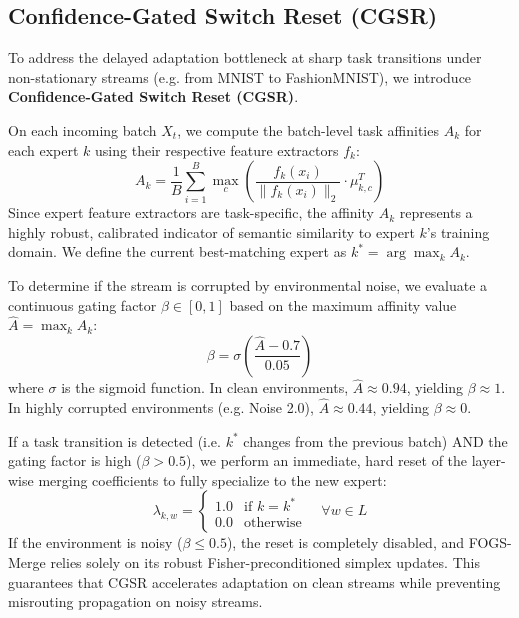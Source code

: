 \documentclass{article}
\theoremstyle{plain}
\theoremstyle{definition}
\theoremstyle{remark}
\begin{document}
\subsection{Confidence-Gated Switch Reset (CGSR)}
To address the delayed adaptation bottleneck at sharp task transitions under non-stationary streams (e.g. from MNIST to FashionMNIST), we introduce \textbf{Confidence-Gated Switch Reset (CGSR)}.

On each incoming batch $X_t$, we compute the batch-level task affinities $A_k$ for each expert $k$ using their respective feature extractors $f_k$:
\begin{equation}
A_k = \frac{1}{B} \sum_{i=1}^B \max_{c} \left( \frac{f_k(x_i)}{\|f_k(x_i)\|_2} \cdot \mu_{k, c}^T \right)
\end{equation}
Since expert feature extractors are task-specific, the affinity $A_k$ represents a highly robust, calibrated indicator of semantic similarity to expert $k$'s training domain. We define the current best-matching expert as $k^* = \arg\max_{k} A_k$.

To determine if the stream is corrupted by environmental noise, we evaluate a continuous gating factor $\beta \in [0, 1]$ based on the maximum affinity value $\hat{A} = \max_k A_k$:
\begin{equation}
\beta = \sigma\left( \frac{\hat{A} - 0.7}{0.05} \right)
\end{equation}
where $\sigma$ is the sigmoid function. In clean environments, $\hat{A} \approx 0.94$, yielding $\beta \approx 1$. In highly corrupted environments (e.g. Noise 2.0), $\hat{A} \approx 0.44$, yielding $\beta \approx 0$.

If a task transition is detected (i.e. $k^*$ changes from the previous batch) AND the gating factor is high ($\beta > 0.5$), we perform an immediate, hard reset of the layer-wise merging coefficients to fully specialize to the new expert:
\begin{equation}
\lambda_{k,w} = 
\begin{cases}
1.0 & \text{if } k = k^* \\
0.0 & \text{otherwise}
\end{cases} \quad \forall w \in L
\end{equation}
If the environment is noisy ($\beta \leq 0.5$), the reset is completely disabled, and FOGS-Merge relies solely on its robust Fisher-preconditioned simplex updates. This guarantees that CGSR accelerates adaptation on clean streams while preventing misrouting propagation on noisy streams.
\end{document}

